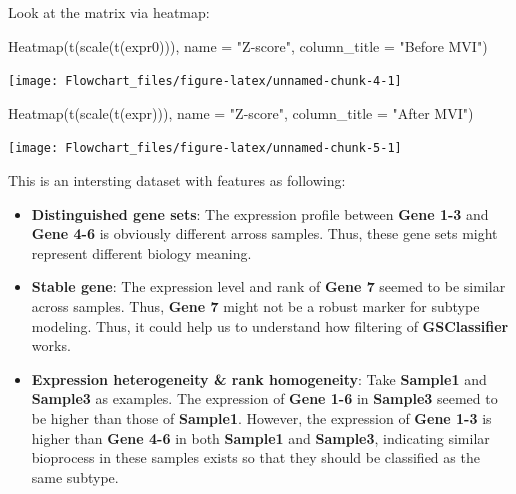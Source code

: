 \documentclass[
  12pt,
]{book}
\newenvironment{Shaded}{\begin{snugshade}}{\end{snugshade}}
\newcommand{\AttributeTok}[1]{\textcolor[rgb]{0.77,0.63,0.00}{#1}}
\newcommand{\FunctionTok}[1]{\textcolor[rgb]{0.00,0.00,0.00}{#1}}
\newcommand{\NormalTok}[1]{#1}
\newcommand{\StringTok}[1]{\textcolor[rgb]{0.31,0.60,0.02}{#1}}
\begin{document}
Look at the matrix via heatmap:

\begin{Shaded}
\begin{Highlighting}[]
\FunctionTok{Heatmap}\NormalTok{(}\FunctionTok{t}\NormalTok{(}\FunctionTok{scale}\NormalTok{(}\FunctionTok{t}\NormalTok{(expr0))), }\AttributeTok{name =} \StringTok{"Z{-}score"}\NormalTok{, }\AttributeTok{column\_title =} \StringTok{"Before MVI"}\NormalTok{)}
\end{Highlighting}
\end{Shaded}

\begin{center}\texttt{[image: Flowchart\_files/figure-latex/unnamed-chunk-4-1]} \end{center}

\begin{Shaded}
\begin{Highlighting}[]
\FunctionTok{Heatmap}\NormalTok{(}\FunctionTok{t}\NormalTok{(}\FunctionTok{scale}\NormalTok{(}\FunctionTok{t}\NormalTok{(expr))), }\AttributeTok{name =} \StringTok{"Z{-}score"}\NormalTok{, }\AttributeTok{column\_title =} \StringTok{"After MVI"}\NormalTok{)}
\end{Highlighting}
\end{Shaded}

\begin{center}\texttt{[image: Flowchart\_files/figure-latex/unnamed-chunk-5-1]} \end{center}

This is an intersting dataset with features as following:

\begin{itemize}
\item
  \textbf{Distinguished gene sets}: The expression profile between \textbf{Gene 1-3} and \textbf{Gene 4-6} is obviously different arross samples. Thus, these gene sets might represent different biology meaning.
\item
  \textbf{Stable gene}: The expression level and rank of \textbf{Gene 7} seemed to be similar across samples. Thus, \textbf{Gene 7} might not be a robust marker for subtype modeling. Thus, it could help us to understand how filtering of \textbf{GSClassifier} works.
\item
  \textbf{Expression heterogeneity \& rank homogeneity}: Take \textbf{Sample1} and \textbf{Sample3} as examples. The expression of \textbf{Gene 1-6} in \textbf{Sample3} seemed to be higher than those of \textbf{Sample1}. However, the expression of \textbf{Gene 1-3} is higher than \textbf{Gene 4-6} in both \textbf{Sample1} and \textbf{Sample3}, indicating similar bioprocess in these samples exists so that they should be classified as the same subtype.
\end{itemize}
\end{document}
